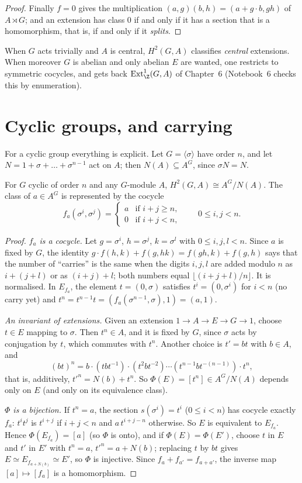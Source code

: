 \begin{proof}
Finally $f=0$ gives the multiplication $(a,g)(b,h)=(a+g\cdot b,gh)$ of $A\rtimes G$; and an extension has class $0$ if and only if it has a section that is a homomorphism, that is, if and only if it \emph{splits}.
\end{proof}

When $G$ acts trivially and $A$ is central, $H^2(G,A)$ classifies \emph{central} extensions. When moreover $G$ is abelian and only abelian $E$ are wanted, one restricts to symmetric cocycles, and gets back
$\operatorname{Ext}^1_\Z(G,A)$ of Chapter~6 (Notebook~6 checks this by enumeration).

\section{Cyclic groups, and carrying}

For a cyclic group everything is explicit. Let $G=\langle\sigma\rangle$ have order $n$, and let $N=1+\sigma+\dots+\sigma^{n-1}$ act on $A$; then $N(A)\subseteq A^G$, since $\sigma N=N$.

\begin{theorem}\label{thm:h2cyclic}
For $G$ cyclic of order $n$ and any $G$-module $A$, $H^2(G,A)\cong A^G/N(A)$. The class of $a\in A^G$ is represented by the cocycle
\[
f_a(\sigma^i,\sigma^j)=\begin{cases}a&\text{if }i+j\ge n,\\0&\text{if }i+j<n,\end{cases}\qquad0\le i,j<n.
\]
\end{theorem}

\begin{proof}
\emph{$f_a$ is a cocycle.} Let $g=\sigma^i$, $h=\sigma^j$, $k=\sigma^l$ with $0\le i,j,l<n$. Since $a$ is fixed by $G$, the identity $g\cdot f(h,k)+f(g,hk)=f(gh,k)+f(g,h)$ says that the number of ``carries'' is the same when the digits
$i,j,l$ are added modulo $n$ as $i+(j+l)$ or as $(i+j)+l$; both numbers equal $\lfloor(i+j+l)/n\rfloor$. It is normalised. In $E_{f_a}$, the element $t=(0,\sigma)$ satisfies $t^i=(0,\sigma^i)$ for $i<n$ (no carry yet) and
$t^n=t^{n-1}t=(f_a(\sigma^{n-1},\sigma),1)=(a,1)$.

\emph{An invariant of extensions.} Given an extension $1\to A\to E\to G\to1$, choose $t\in E$ mapping to $\sigma$. Then $t^n\in A$, and it is fixed by $G$, since $\sigma$ acts by conjugation by $t$, which commutes with $t^n$. Another choice is
$t'=bt$ with $b\in A$, and
\[
(bt)^n=b\cdot(tbt^{-1})\cdot(t^2bt^{-2})\cdots(t^{n-1}bt^{-(n-1)})\cdot t^n,
\]
that is, additively, $t'^n=N(b)+t^n$. So $\Phi(E)=[t^n]\in A^G/N(A)$ depends only on $E$ (and only on its equivalence class).

\emph{$\Phi$ is a bijection.} If $t^n=a$, the section $s(\sigma^i)=t^i$ ($0\le i<n$) has cocycle exactly $f_a$: $t^it^j$ is $t^{i+j}$ if $i+j<n$ and $a\,t^{i+j-n}$ otherwise. So $E$ is equivalent to $E_{f_a}$. Hence
$\Phi(E_{f_a})=[a]$ (so $\Phi$ is onto), and if $\Phi(E)=\Phi(E')$, choose $t$ in $E$ and $t'$ in $E'$ with $t^n=a$, $t'^n=a+N(b)$; replacing $t$ by $bt$ gives $E\simeq E_{f_{a+N(b)}}\simeq E'$, so $\Phi$ is injective.
Since $f_a+f_{a'}=f_{a+a'}$, the inverse map $[a]\mapsto[f_a]$ is a homomorphism.
\end{proof}

